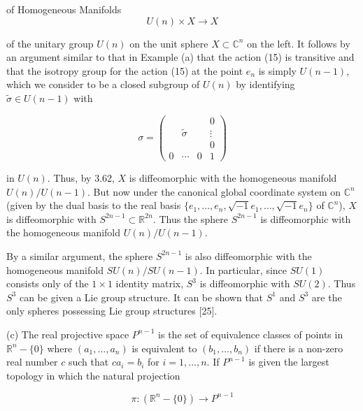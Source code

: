 \begin{examples}{of Homogeneous Manifolds}
\begin{equation}
\tag{15}\label{eq:3.65:15}
U(n)\times X\to X
\end{equation}

of the unitary group $U(n)$ on the unit sphere $X\subset\mathbb{C}^n$ on the left. It follows by an argument similar to that in Example (a) that the action (15) is transitive and that the isotropy group for the action (15) at the point $e_n$ is simply $U(n-1)$, which we consider to be a closed subgroup of $U(n)$ by identifying $\tilde{\sigma} \in U(n-1)$ with

\begin{equation}
\tag{16}\label{eq:3.65:16}
\sigma=\begin{pmatrix} & & & 0\\ & \tilde{\sigma} & & \vdots\\ & & & 0\\ 0 & \cdots & 0 & 1\end{pmatrix}
\end{equation}

in $U(n)$. Thus, by 3.62, $X$ is diffeomorphic with the homogeneous manifold $U(n)/U(n-1)$. But now under the canonical global coordinate system on $\mathbb{C}^n$ (given by the dual basis to the real basis $\{e_1, \ldots, e_n, \sqrt{-1}e_1, \ldots, \sqrt{-1}e_n\}$ of $\mathbb{C}^n$), $X$ is diffeomorphic with $S^{2n-1} \subset \mathbb{R}^{2n}$. Thus the sphere $S^{2n-1}$ is diffeomorphic with the homogeneous manifold $U(n)/U(n-1)$.

By a similar argument, the sphere $S^{2n-1}$ is also diffeomorphic with the homogeneous manifold $SU(n)/SU(n-1)$. In particular, since $SU(1)$ consists only of the $1\times1$ identity matrix, $S^{3}$ is diffeomorphic with $SU(2)$. Thus $S^{3}$ can be given a Lie group structure. It can be shown that $S^{1}$ and $S^{3}$ are the only spheres possessing Lie group structures [25].

(c) The real projective space  $ P^{n-1} $ is the set of equivalence classes of points in  $ \mathbb{R}^n - \{0\} $ where  $ (a_1, \ldots, a_n) $ is equivalent to  $ (b_1, \ldots, b_n) $ if there is a non-zero real number  $ c $ such that  $ ca_i = b_i $ for  $ i = 1, \ldots, n $. If  $ P^{n-1} $ is given the largest topology in which the natural projection 

\begin{equation}
\tag{17}\label{eq:3.65:17}
\pi\colon(\mathbb{R}^{n}-\{0\})\to P^{n-1}
\end{equation}


\end{examples}
